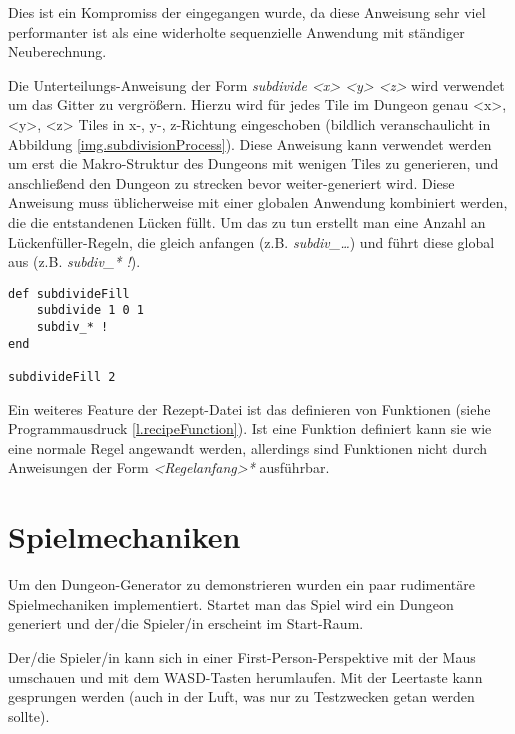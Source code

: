 Dies ist ein Kompromiss der eingegangen wurde, da diese Anweisung sehr viel performanter ist als eine widerholte sequenzielle Anwendung mit ständiger Neuberechnung. 


Die Unterteilungs-Anweisung der Form \textit{subdivide <x> <y> <z>} wird verwendet um das Gitter zu vergrößern. Hierzu wird für jedes Tile im Dungeon genau <x>, <y>, <z> Tiles in x-, y-, z-Richtung eingeschoben (bildlich veranschaulicht in Abbildung \ref{img.subdivisionProcess}). Diese Anweisung kann verwendet werden um erst die Makro-Struktur des Dungeons mit wenigen Tiles zu generieren, und anschließend den Dungeon zu strecken bevor weiter-generiert wird. 
Diese Anweisung muss üblicherweise mit einer globalen Anwendung kombiniert werden, die die entstandenen Lücken füllt. Um das zu tun erstellt man eine Anzahl an Lückenfüller-Regeln, die gleich anfangen (z.B. \textit{subdiv\_\dots}) und führt diese global aus (z.B. \textit{subdiv\_* !}). \\
\begin{lstlisting}[label=l.recipeFunction, caption={Beispiel einer Funktionsdefinition in der Rezept-Datei}] 
def subdivideFill
    subdivide 1 0 1
    subdiv_* !
end

subdivideFill 2
\end{lstlisting} 
Ein weiteres Feature der Rezept-Datei ist das definieren von Funktionen (siehe Programmausdruck \ref{l.recipeFunction}). Ist eine Funktion definiert kann sie wie eine normale Regel angewandt werden, allerdings sind Funktionen nicht durch Anweisungen der Form \textit{<Regelanfang>*} ausführbar.


\section{Spielmechaniken}\label{s.spielmechaniken}

Um den Dungeon-Generator zu demonstrieren wurden ein paar rudimentäre Spielmechaniken implementiert. Startet man das Spiel wird ein Dungeon generiert und der/die Spieler/in erscheint im Start-Raum.

Der/die Spieler/in kann sich in einer First-Person-Perspektive mit der Maus umschauen und mit dem WASD-Tasten herumlaufen. Mit der Leertaste kann gesprungen werden (auch in der Luft, was nur zu Testzwecken getan werden sollte).

